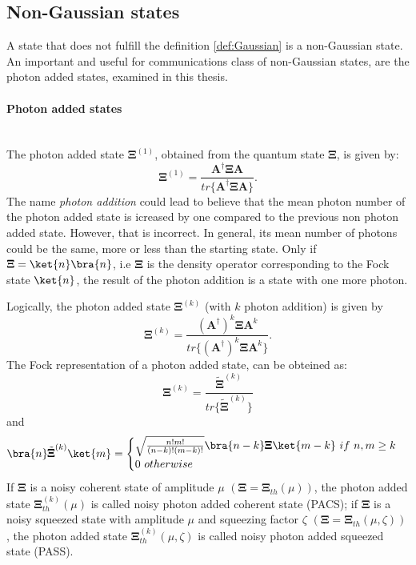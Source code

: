     \subsection{Non-Gaussian states}
    A state that does not fulfill the definition \ref{def:Gaussian} is a non-Gaussian state.
    An important and useful for communications class of non-Gaussian states, are the photon 
    added states, examined in this thesis.

    \paragraph{Photon added states}\mbox{} \\
        \label{PAS}
        The photon added state $\pmb{\Xi}^{(1)}$, obtained from the quantum state $\pmb{\Xi}$,
        is given by:
        \begin{equation}
            \pmb{\Xi}^{(1)}=\frac{\pmb{A}^\dagger\pmb{\Xi}\pmb{A}}
            {tr\{\pmb{A}^\dagger\pmb{\Xi}\pmb{A}\}}.
        \end{equation}
        The name \emph{photon addition} could lead to believe that the mean photon number of the 
        photon added state is icreased by one compared to the previous non photon added state.
        However, that is incorrect.
        In general, its mean number of photons could be the same, more or less than the starting state.
        Only if $\pmb{\Xi}=\ket{n}\bra{n}$, i.e $\pmb{\Xi}$ is the density operator corresponding to
        the Fock state $\ket{n}$, the result of the photon addition is a state with one more photon.

        Logically, the photon added state $\pmb{\Xi}^{(k)}$ (with $k$ photon addition) is given by
        \begin{equation}
            \pmb{\Xi}^{(k)}=\frac{(\pmb{A}^\dagger)^k\pmb{\Xi}\pmb{A}^k}
            {tr\{(\pmb{A}^\dagger)^k\pmb{\Xi}\pmb{A}^k\}}.
        \end{equation}
        The Fock representation of a photon added state, can be obteined as:
        \begin{equation}
            \pmb{\Xi}^{(k)}=\frac{\tilde{\pmb{\Xi}}^{(k)}}{tr\{\tilde{\pmb{\Xi}}^{(k)}\}}
        \end{equation}
        and
        \begin{equation*}
            \bra{n}\tilde{\pmb{\Xi}}^{(k)}\ket{m}=
            \begin{cases}
                \sqrt{\frac{n!m!}{(n-k)!(m-k)!}}\bra{n-k}\pmb{\Xi}\ket{m-k}\ if\ n,m \geq k\\
                0\ otherwise
            \end{cases}
        \end{equation*}
        If $\pmb{\Xi}$ is a noisy coherent state of amplitude $\mu$ $(\pmb{\Xi}=\pmb{\Xi}_{th}(\mu))$,
        the photon added state $\pmb{\Xi}_{th}^{(k)}(\mu)$ is called noisy photon added coherent state
        (PACS); if $\pmb{\Xi}$ is a noisy squeezed state with amplitude $\mu$ and squeezing factor 
        $\zeta$ $(\pmb{\Xi}=\pmb{\Xi}_{th}(\mu,\zeta))$, the photon added state $\pmb{\Xi}_{th}^{(k)}
        (\mu,\zeta)$ is called noisy photon added squeezed state (PASS).